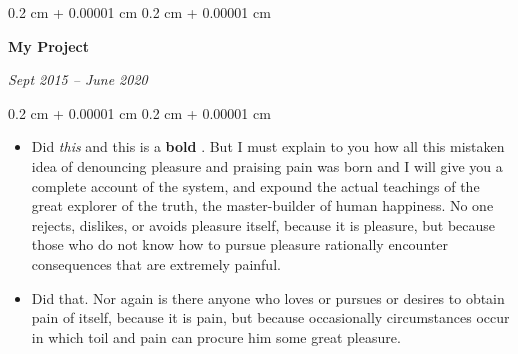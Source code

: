 \documentclass[10pt, letterpaper]{article}
\newenvironment{highlights}{
    \begin{itemize}[
        topsep=0.10 cm,
        parsep=0.10 cm,
        partopsep=0pt,
        itemsep=0pt,
        leftmargin=0.4 cm + 10pt
    ]
}{
    \end{itemize}
} %
\newenvironment{onecolentry}{
    \begin{adjustwidth}{
        0.2 cm + 0.00001 cm
    }{
        0.2 cm + 0.00001 cm
    }
}{
    \end{adjustwidth}
} %
\newenvironment{twocolentry}[2][]{
    \onecolentry
    \def\secondColumn{#2}
    \setcolumnwidth{\fill, 4.5 cm}
    \begin{paracol}{2}
}{
    \switchcolumn \raggedleft \secondColumn
    \end{paracol}
    \endonecolentry
} %
\let\hrefWithoutArrow\href
\renewcommand{\href}[2]{\hrefWithoutArrow{#1}{\ifthenelse{\equal{#2}{}}{ }{#2 }\raisebox{.15ex}{\footnotesize \faExternalLink*}}}
\begin{document}
        \begin{twocolentry}{
            
            
        \textit{Sept 2015 – June 2020}}
            \textbf{My Project}
        \end{twocolentry}
        \vspace{0.10 cm}
        \begin{onecolentry}
            \begin{highlights}
                \item Did \textit{this} and this is a \textbf{bold} \href{https://example.com}{link}. But I must explain to you how all this mistaken idea of denouncing pleasure and praising pain was born and I will give you a complete account of the system, and expound the actual teachings of the great explorer of the truth, the master-builder of human happiness. No one rejects, dislikes, or avoids pleasure itself, because it is pleasure, but because those who do not know how to pursue pleasure rationally encounter consequences that are extremely painful.
                \item Did that. Nor again is there anyone who loves or pursues or desires to obtain pain of itself, because it is pain, but because occasionally circumstances occur in which toil and pain can procure him some great pleasure.
            \end{highlights}
        \end{onecolentry}


        \vspace{0.2 cm}
\end{document}
